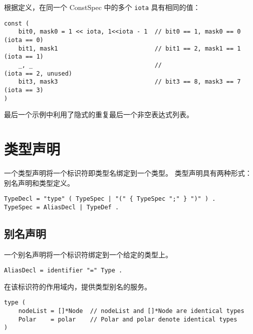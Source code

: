 根据定义，在同一个 ConstSpec 中的多个 \lstinline|iota| 具有相同的值：
\begin{lstlisting}[style=golang]
const (
	bit0, mask0 = 1 << iota, 1<<iota - 1  // bit0 == 1, mask0 == 0  (iota == 0)
	bit1, mask1                           // bit1 == 2, mask1 == 1  (iota == 1)
	_, _                                  //                        (iota == 2, unused)
	bit3, mask3                           // bit3 == 8, mask3 == 7  (iota == 3)
)
\end{lstlisting}
最后一个示例中利用了隐式的重复最后一个非空表达式列表。


\section{类型声明}
一个类型声明将一个标识符即类型名绑定到一个类型。
类型声明具有两种形式：别名声明和类型定义。
\begin{lstlisting}[style=golang]
TypeDecl = "type" ( TypeSpec | "(" { TypeSpec ";" } ")" ) .
TypeSpec = AliasDecl | TypeDef .
\end{lstlisting}

\subsection{别名声明}
一个别名声明将一个标识符绑定到一个给定的类型上。
\begin{lstlisting}[style=EBNF]
AliasDecl = identifier "=" Type .
\end{lstlisting}
在该标识符的作用域内，提供类型别名的服务。
\begin{lstlisting}[style=golang]
type (
	nodeList = []*Node  // nodeList and []*Node are identical types
	Polar    = polar    // Polar and polar denote identical types
)
\end{lstlisting}

